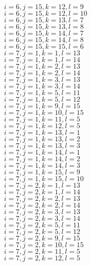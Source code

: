 \documentclass[14pt]{article}
\begin{document}
    $i=6,j=15,k=12,l=9 $ \\ 
    $i=6,j=15,k=12,l=10 $ \\ 
    $i=6,j=15,k=13,l=7 $ \\ 
    $i=6,j=15,k=13,l=8 $ \\ 
    $i=6,j=15,k=14,l=7 $ \\ 
    $i=6,j=15,k=14,l=8 $ \\ 
    $i=6,j=15,k=15,l=6 $ \\ 
    $i=7,j=1,k=1,l=13 $ \\ 
    $i=7,j=1,k=1,l=14 $ \\ 
    $i=7,j=1,k=2,l=13 $ \\ 
    $i=7,j=1,k=2,l=14 $ \\ 
    $i=7,j=1,k=3,l=13 $ \\ 
    $i=7,j=1,k=3,l=14 $ \\ 
    $i=7,j=1,k=5,l=11 $ \\ 
    $i=7,j=1,k=5,l=12 $ \\ 
    $i=7,j=1,k=9,l=15 $ \\ 
    $i=7,j=1,k=10,l=15 $ \\ 
    $i=7,j=1,k=11,l=5 $ \\ 
    $i=7,j=1,k=12,l=5 $ \\ 
    $i=7,j=1,k=13,l=1 $ \\ 
    $i=7,j=1,k=13,l=2 $ \\ 
    $i=7,j=1,k=13,l=3 $ \\ 
    $i=7,j=1,k=14,l=1 $ \\ 
    $i=7,j=1,k=14,l=2 $ \\ 
    $i=7,j=1,k=14,l=3 $ \\ 
    $i=7,j=1,k=15,l=9 $ \\ 
    $i=7,j=1,k=15,l=10 $ \\ 
    $i=7,j=2,k=1,l=13 $ \\ 
    $i=7,j=2,k=1,l=14 $ \\ 
    $i=7,j=2,k=2,l=13 $ \\ 
    $i=7,j=2,k=2,l=14 $ \\ 
    $i=7,j=2,k=3,l=13 $ \\ 
    $i=7,j=2,k=3,l=14 $ \\ 
    $i=7,j=2,k=5,l=11 $ \\ 
    $i=7,j=2,k=5,l=12 $ \\ 
    $i=7,j=2,k=9,l=15 $ \\ 
    $i=7,j=2,k=10,l=15 $ \\ 
    $i=7,j=2,k=11,l=5 $ \\ 
    $i=7,j=2,k=12,l=5 $ \\ 
\end{document}
